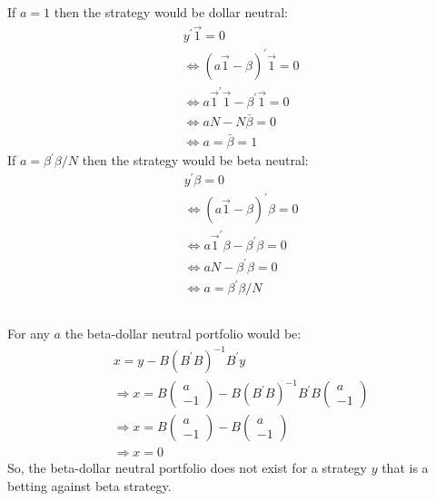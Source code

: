 \documentclass[hidelinks,12pt]{article}
\begin{document}
\subsection{}
If $a = 1$ then the strategy would be dollar neutral:
\begin{equation*}
    \begin{aligned}
        & y^{'} \overrightarrow{1} = 0 \\
        & \Leftrightarrow (a \overrightarrow{1}  - \beta )^{'} \overrightarrow{1} = 0 \\
        & \Leftrightarrow a \overrightarrow{1}^{'} \overrightarrow{1} - \beta^{'} \overrightarrow{1} = 0 \\
        & \Leftrightarrow a N - N \bar{\beta} = 0 \\
        & \Leftrightarrow a = \bar{\beta} = 1
    \end{aligned}
\end{equation*}
If $a = \beta^{'} \beta /N$ then the strategy would be beta neutral:
\begin{equation*}
    \begin{aligned}
        & y^{'} \beta = 0 \\
        & \Leftrightarrow (a \overrightarrow{1}  - \beta )^{'} \beta = 0 \\
        & \Leftrightarrow a \overrightarrow{1}^{'} \beta - \beta^{'} \beta = 0 \\
        & \Leftrightarrow a N - \beta^{'} \beta = 0 \\
        & \Leftrightarrow a = \beta^{'} \beta /N
    \end{aligned}
\end{equation*}
\subsection{}
For any $a$ the beta-dollar neutral portfolio would be:
\begin{equation*}
    \begin{aligned}
        & x = y - B (B^{'} B)^{-1} B^{'} y \\
        & \Rightarrow x = B
            \begin{pmatrix}
                a \\
                -1
            \end{pmatrix}
        - B (B^{'} B)^{-1} B^{'} B\begin{pmatrix}
            a \\
            -1
        \end{pmatrix} \\
        & \Rightarrow x = B
            \begin{pmatrix}
                a \\
                -1
            \end{pmatrix} - B\begin{pmatrix}
            a \\
            -1
        \end{pmatrix} \\
        & \Rightarrow x = 0
    \end{aligned}
\end{equation*}
So, the beta-dollar neutral portfolio does not exist for a strategy $y$ that is a betting against beta strategy.
\end{document}
